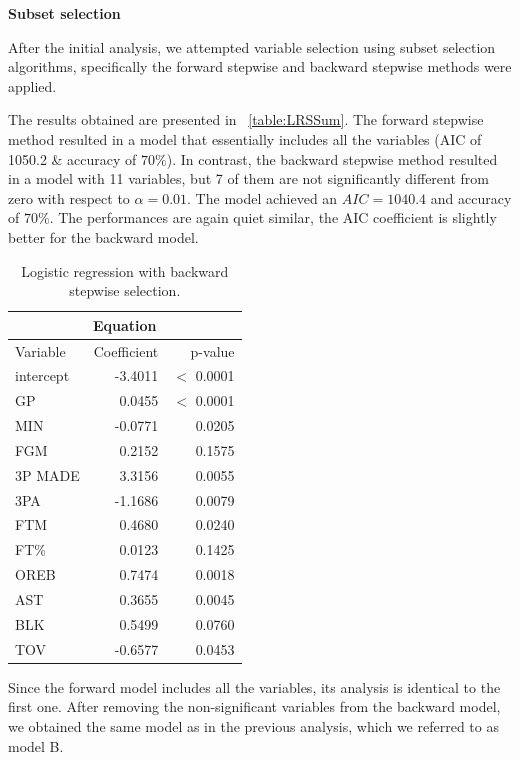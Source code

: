 \vspace{0.2cm}
\textbf{Subset selection}

After the initial analysis, we attempted variable selection using subset selection algorithms, specifically the forward stepwise and backward stepwise methods were applied. 

The results obtained are presented in \Tab~\ref{table:LRSSum}. The forward stepwise method resulted in a model that essentially includes all the variables (AIC of 1050.2 \& accuracy of $70\%$). In contrast, the backward stepwise method resulted in a model with 11 variables, but 7 of them are not significantly different from zero with respect to $\alpha = 0.01$. The model achieved an $AIC = 1040.4$ and accuracy of $70\%$. The performances are again quiet similar, the AIC coefficient is slightly better for the backward model.

\begin{table}[H]
	\centering
	\begin{tabular}{|| l | r | r ||} 
		\hline
		\multicolumn{3}{|c|}{Equation} \\
		\hline
		Variable & Coefficient & p-value \\
		\hline
		intercept & -3.4011 & $<$ 0.0001 \\
		GP & 0.0455 & $<$ 0.0001 \\
		MIN & -0.0771 & 0.0205 \\
		FGM & 0.2152 & 0.1575 \\
		3P MADE & 3.3156 & 0.0055 \\
		3PA & -1.1686 & 0.0079 \\
		FTM & 0.4680 & 0.0240 \\
		FT\% & 0.0123 & 0.1425 \\
		OREB & 0.7474 & 0.0018 \\
		AST & 0.3655 & 0.0045 \\
		BLK & 0.5499 & 0.0760 \\				
		TOV & -0.6577 & 0.0453 \\
		\hline
	\end{tabular}
	\caption{Logistic regression with backward stepwise selection.}
	\label{table:LRBSSum}
\end{table}
Since the forward model includes all the variables, its analysis is identical to the first one.
After removing the non-significant variables from the backward model, we obtained the same model as in the previous analysis, which we referred to as model B. 

